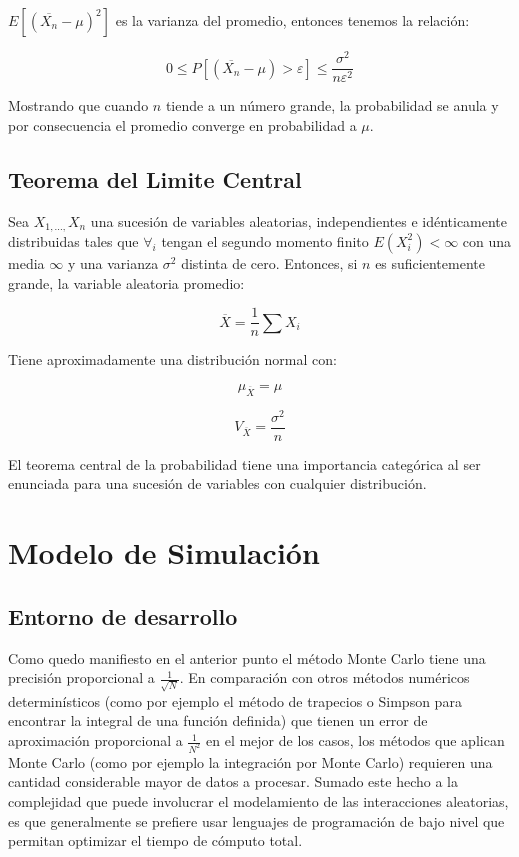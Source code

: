 \documentclass{rbf}
\begin{document}
$E[(\overline{X_n}-\mu)^2]$ es la varianza del promedio, entonces tenemos la relación:

\begin{equation}
  \displaystyle   0\leq P[(\overline{X_n}-\mu)>\varepsilon] \leq \frac{\sigma^2}{n\varepsilon^2}
\end{equation}

Mostrando que cuando $n$ tiende a un número grande, la probabilidad se anula y por consecuencia el promedio converge en probabilidad a $\mu$.

\subsection{Teorema del Limite Central}
Sea $X_{1,...,} X_n$ una sucesión de variables aleatorias, independientes e idénticamente distribuidas tales que $\forall_i$  tengan el segundo momento finito  $E(X_i^2)<\infty$ con una media $\infty$ y una varianza $\sigma^2$ distinta de cero. Entonces, si $n$ es suficientemente grande, la variable aleatoria promedio:

\begin{equation}
  \displaystyle   \overline{X}=\frac{1}{n}\sum X_i
\end{equation}

Tiene aproximadamente una distribución normal con:

\begin{equation}
 \displaystyle    \mu_{\overline{X}} =\mu
\end{equation}

\begin{equation}
  \displaystyle   V_{\overline{X}} =\frac{\sigma^2}{n}
\end{equation}

El teorema central de la probabilidad tiene una importancia categórica al ser enunciada para una sucesión de variables con cualquier distribución. 

\section{Modelo de Simulación}
\subsection{Entorno de desarrollo}

Como quedo manifiesto en el anterior punto el método Monte Carlo tiene una precisión proporcional a $\frac{1}{\sqrt{N}}$. En comparación con otros métodos numéricos determinísticos (como por ejemplo el método de trapecios o Simpson para encontrar la integral de una función definida) que tienen un error de aproximación proporcional a $\frac{1}{N^2}$ en el mejor de los casos, los métodos que aplican Monte Carlo (como por ejemplo la integración por Monte Carlo) requieren una cantidad considerable mayor de datos a procesar. Sumado este hecho a la complejidad que puede involucrar el modelamiento de las interacciones aleatorias, es que generalmente se prefiere usar lenguajes de programación de bajo nivel que permitan optimizar el tiempo de cómputo total.
\end{document}
